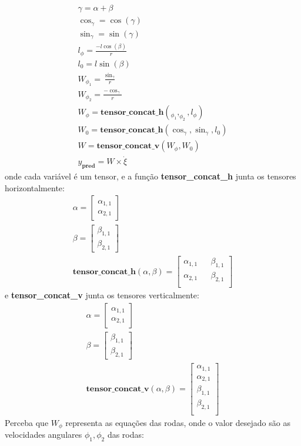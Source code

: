 \begin{align}
    \gamma = \alpha + \beta \\
    \cos_{\gamma} = \cos(\gamma) \\
    \sin_{\gamma} = \sin(\gamma) \\
    l_{\phi} = \frac{-l\cos(\beta)}{r} \\
    l_{0} = l\sin(\beta) \\
    W_{\phi_1} = \frac{\sin_{\gamma}}{r} \\
    W_{\phi_2} = \frac{-\cos_{\gamma}}{r} \\
    W_{\phi} = \textbf{tensor\_concat\_h}(_{\phi_1},_{\phi_2}, l_{\phi})\\
    W_{0} = \textbf{tensor\_concat\_h}(\cos_{\gamma},\sin_{\gamma},  l_{0}) \\
    W = \textbf{tensor\_concat\_v}( W_{\phi}, W_{0} ) \\
    y_{\textbf{pred}} =  W \times  \dot{\xi} 
\end{align}
onde cada variável é um tensor, e a
função \textbf{tensor\_concat\_h} junta os tensores horizontalmente:
\begin{align}
    \alpha = 
    \begin{bmatrix}
         \alpha_{1,1} \\
         \alpha_{2,1}
    \end{bmatrix}
    \\
    \beta =
    \begin{bmatrix}
        \beta_{1,1} \\
        \beta_{2,1}
   \end{bmatrix}\\
   \textbf{tensor\_concat\_h}( \alpha, \beta ) =
   \begin{bmatrix}
    \alpha_{1,1} && \beta_{1,1} \\
    \alpha_{2,1} &&  \beta_{2,1} \\
\end{bmatrix}
\end{align}
e \textbf{tensor\_concat\_v} junta os tensores verticalmente:
\begin{align}
    \alpha = 
    \begin{bmatrix}
         \alpha_{1,1} \\
         \alpha_{2,1}
    \end{bmatrix}
    \\
    \beta =
    \begin{bmatrix}
        \beta_{1,1} \\
        \beta_{2,1}
   \end{bmatrix}\\
   \textbf{tensor\_concat\_v}( \alpha, \beta ) =
   \begin{bmatrix}
    \alpha_{1,1} \\
    \alpha_{2,1} \\
    \beta_{1,1} \\
    \beta_{2,1} \\
\end{bmatrix}
\end{align}
Perceba que $W_{\phi}$ representa as equações das rodas, onde
o valor desejado são as velocidades angulares $\phi_1,\phi_2$ das rodas:

